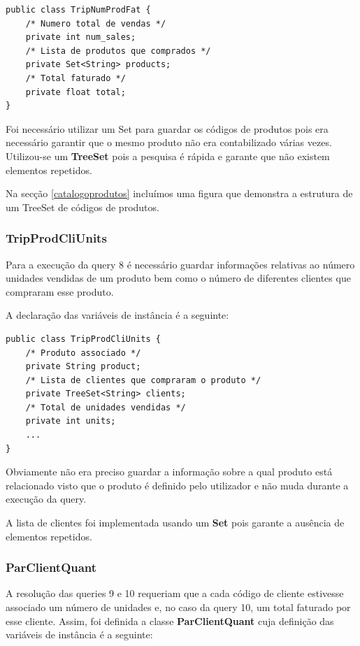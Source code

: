 \documentclass[10pt] {article}
\begin{document}
\begin{lstlisting}
public class TripNumProdFat {
	/* Numero total de vendas */
	private int num_sales;
	/* Lista de produtos que comprados */
	private Set<String> products;
	/* Total faturado */
	private float total;
}
\end{lstlisting}


Foi necessário utilizar um Set para guardar os códigos de produtos pois era necessário garantir que o mesmo produto não era
contabilizado várias vezes.
Utilizou-se um \color{blue} \textbf{TreeSet} \color{black} pois a pesquisa é rápida e garante que não existem elementos
repetidos.

Na secção \ref{catalogoprodutos} incluímos uma figura que demonstra a estrutura de um TreeSet de códigos de produtos.

\subsubsection{TripProdCliUnits}

Para a execução da query 8 é necessário guardar informações relativas ao número unidades vendidas de um produto
bem como o número de diferentes clientes que compraram esse produto.

A declaração das variáveis de instância é a seguinte:

\begin{lstlisting}
public class TripProdCliUnits {
	/* Produto associado */
	private String product;
	/* Lista de clientes que compraram o produto */
	private TreeSet<String> clients;
	/* Total de unidades vendidas */
	private int units;
	...
}
\end{lstlisting}


Obviamente não era preciso guardar a informação sobre a qual produto está relacionado visto que o produto é definido pelo utilizador e não muda durante a execução da query.

A lista de clientes foi implementada usando um \color{blue} \textbf{Set} \color{black} pois garante a ausência de elementos
repetidos.

\subsubsection{ParClientQuant}

A resolução das queries 9 e 10 requeriam que a cada código de cliente estivesse associado um número de unidades e, no caso da query 10, um total faturado por esse cliente. Assim, foi definida a classe \color{blue} \textbf{ParClientQuant} \color{black} cuja
definição das variáveis de instância é a seguinte:
\end{document}
